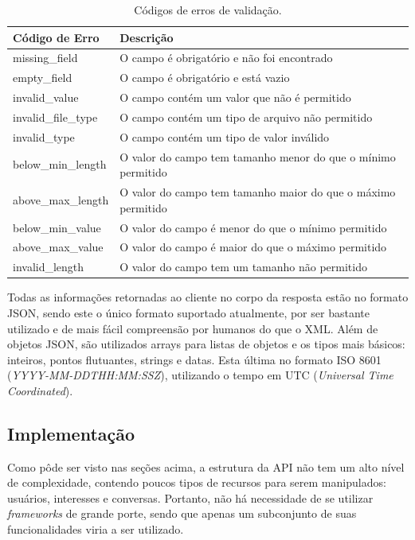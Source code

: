 \documentclass[diss]{template/setrem}
\begin{document}
\begin{table}
  \begin{center}
  	\footnotesize
  	\renewcommand{\arraystretch}{1.5}
    \begin{tabular}{ | l | l |}
    \hline
	
	\textbf{Código de Erro} & \textbf{Descrição} \\ \hline
	missing\_field & O campo é obrigatório e não foi encontrado \\ \hline
	empty\_field & O campo é obrigatório e está vazio \\ \hline
	invalid\_value & O campo contém um valor que não é permitido \\ \hline
	invalid\_file\_type & O campo contém um tipo de arquivo não permitido \\ \hline
	invalid\_type & O campo contém um tipo de valor inválido \\ \hline
	below\_min\_length & O valor do campo tem tamanho menor do que o mínimo permitido \\ \hline
	above\_max\_length & O valor do campo tem tamanho maior do que o máximo permitido \\ \hline
	below\_min\_value & O valor do campo é menor do que o mínimo permitido \\ \hline
	above\_max\_value & O valor do campo é maior do que o máximo permitido \\ \hline
	invalid\_length & O valor do campo tem um tamanho não permitido \\ \hline
	
    \hline
    \end{tabular}
  \end{center}
  
  \caption{Códigos de erros de validação.}
  \label{tab:validation-codes}
\end{table}

Todas as informações retornadas ao cliente no corpo da resposta estão no formato JSON, sendo este o único formato suportado atualmente, por ser bastante utilizado e de mais fácil compreensão por humanos do que o XML. Além de objetos JSON, são utilizados arrays para listas de objetos e os tipos mais básicos: inteiros, pontos flutuantes, strings e datas. Esta última no formato ISO 8601 (\emph{YYYY-MM-DDTHH:MM:SSZ}), utilizando o tempo em UTC (\emph{Universal Time Coordinated}).

\subsection{Implementação}
Como pôde ser visto nas seções acima, a estrutura da API não tem um alto nível de complexidade, contendo poucos tipos de recursos para serem manipulados: usuários, interesses e conversas. Portanto, não há necessidade de se utilizar \emph{frameworks} de grande porte, sendo que apenas um subconjunto de suas funcionalidades viria a ser utilizado.
\end{document}
